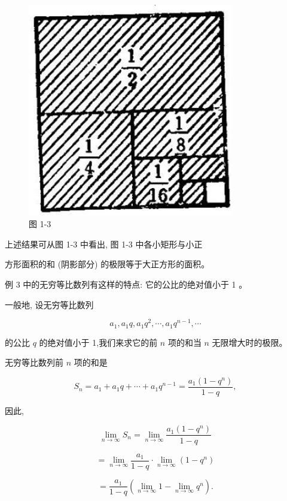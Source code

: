 \documentclass[lang=cn,newtx,12pt,scheme=chinese]{elegantbook}
\begin{document}
\begin{figure}[h]
	\centering
	\includegraphics[max width=0.8\textwidth]{images/01912c18-5c3f-733d-b775-749ba9897a9d_14_791114.jpg}
	\caption{图 1-3}
\end{figure}

上述结果可从图 1-3 中看出, 图 1-3 中各小矩形与小正

方形面积的和 (阴影部分) 的极限等于大正方形的面积。

例 3 中的无穷等比数列有这样的特点: 它的公比的绝对值小于 1 。

一般地, 设无穷等比数列

\[
{a}_{1},{a}_{1}q,{a}_{1}{q}^{2},\cdots ,{a}_{1}{q}^{n - 1},\cdots
\]

的公比 \(q\) 的绝对值小于 1,我们来求它的前 \(n\) 项的和当 \(n\) 无限增大时的极限。

无穷等比数列前 \(n\) 项的和是

\[
{S}_{n} = {a}_{1} + {a}_{1}q + \cdots + {a}_{1}{q}^{n - 1} = \frac{{a}_{1}\left( {1 - {q}^{n}}\right) }{1 - q},
\]

因此,

\[
\mathop{\lim }\limits_{{n \rightarrow \infty }}{S}_{n} = \mathop{\lim }\limits_{{n \rightarrow \infty }}\frac{{a}_{1}\left( {1 - {q}^{n}}\right) }{1 - q}
\]

\[
= \mathop{\lim }\limits_{{n \rightarrow \infty }}\frac{{a}_{1}}{1 - q} \cdot \mathop{\lim }\limits_{{n \rightarrow \infty }}\left( {1 - {q}^{n}}\right)
\]

\[
= \frac{{a}_{1}}{1 - q}\left( {\mathop{\lim }\limits_{{n \rightarrow \infty }}1 - \mathop{\lim }\limits_{{n \rightarrow \infty }}{q}^{n}}\right) .
\]
\end{document}

